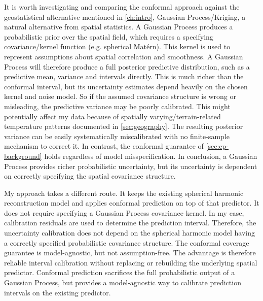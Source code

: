 \documentclass[11pt,a4paper]{report}
\begin{document}
It is worth investigating and comparing the conformal approach against the geostatistical alternative mentioned in \cref{ch:intro}, Gaussian Process/Kriging, a natural alternative from spatial statistics. A Gaussian Process produces a probabilistic prior over the spatial field, which requires a specifying covariance/kernel function (e.g. spherical Matérn). This kernel is used to represent assumptions about spatial correlation and smoothness. A Gaussian Process will therefore produce a full posterior predictive distribution, such as a predictive mean, variance and intervals directly. This is much richer than the conformal interval, but its uncertainty estimates depend heavily on the chosen kernel and noise model. So if the assumed covariance structure is wrong or misleading, the predictive variance may be poorly calibrated. This might potentially affect my data because of spatially varying/terrain-related temperature patterns documented in \cref{sec:geography}. The resulting posterior variance can be easily systematically miscalibrated with no finite-sample mechanism to correct it. In contrast, the conformal guarantee of \cref{sec:cp-background} holds regardless of model misspecification. In conclusion, a Gaussian Process provides richer probabilistic uncertainty, but its uncertainty is dependent on correctly specifying the spatial covariance structure. 

My approach takes a different route. It keeps the existing spherical harmonic reconstruction model and applies conformal prediction on top of that predictor. It does not require specifying a Gaussian Process covariance kernel. In my case, calibration residuals are used to determine the prediction interval. Therefore, the uncertainty calibration does not depend on the spherical harmonic model having a correctly specified probabilistic covariance structure. The conformal coverage guarantee is model-agnostic, but not assumption-free. The advantage is therefore reliable interval calibration without replacing or rebuilding the underlying spatial predictor. Conformal prediction sacrifices the full probabilistic output of a Gaussian Process, but provides a model-agnostic way to calibrate prediction intervals on the existing predictor.
\end{document}
